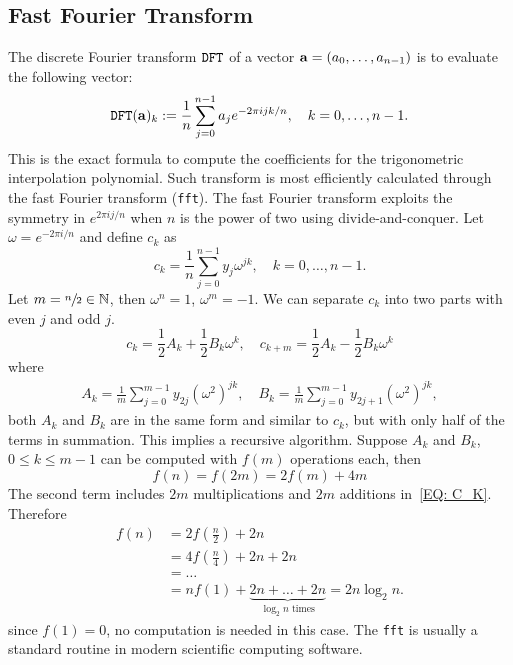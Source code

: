 \subsection{Fast Fourier Transform}
\label{SSec: 2-Fas-Fou-Tra}
The discrete Fourier transform $\textup{\texttt{DFT}}$ of a vector $\mathbf a = (a_0, \dots, a_{n-1})$ is to evaluate the following vector:
$$\textup{\texttt{DFT}}(\mathbf a)_{k} := \frac{1}{n}\sum_{j=0}^{n-1} a_je^{-2\pi i jk/n},\quad k = 0,\dots, n-1.$$
This is the exact formula to compute the coefficients for the trigonometric interpolation polynomial. Such transform is most efficiently calculated through the fast Fourier transform (\texttt{fft}).
The fast Fourier transform exploits the symmetry in $e^{2\pi i j/n}$ when $n$ is the power of two using divide-and-conquer. Let $\omega = e^{-2\pi i/n}$ and define $c_k$ as 
\begin{equation}
    c_k = \frac{1}{n}\sum_{j=0}^{n-1} y_j\omega^{jk},\quad k = 0,\dots, n-1.
\end{equation}
Let $m = \sfrac{n}{2}\in \mathbb N$, then $\omega^n = 1$, $\omega^m = -1$. We can separate $c_k$ into two parts with even $j$ and odd $j$.
\begin{equation}\label{EQ: C_K}
    c_k = \frac{1}{2} A_k + \frac{1}{2} B_k \omega^k,\quad c_{k+m} = \frac{1}{2} A_k - \frac{1}{2} B_k \omega^k 
\end{equation}
where 
\begin{equation}\label{EQ: AK BK}
    \begin{aligned}
        A_k = \frac{1}{m} \sum_{j=0}^{m-1} y_{2j} (\omega^2)^{jk},\quad B_k = \frac{1}{m} \sum_{j=0}^{m-1} y_{2j+1} (\omega^2)^{jk},
    \end{aligned}
\end{equation}
both $A_k$ and $B_k$ are in the same form and similar to $c_k$, but with only half of the terms in summation. This implies a recursive algorithm. Suppose $A_k$ and $B_k$, $0\le k\le m-1$ can be computed with $f(m)$ operations each, then 
\begin{equation}
   f(n) =  f(2m) = 2 f(m) + 4m
\end{equation}
The second term includes $2m$ multiplications and $2m$ additions in~\eqref{EQ: C_K}. Therefore
\begin{equation}
    \begin{aligned}
        f(n)& = 2f(\frac{n}{2}) + 2n \\
&= 4f(\frac{n}{4}) + 2 n + 2n \\ 
&=\dots \\
&= n f(1) + \underbrace{2n + \dots + 2n}_{\log_2 n \text{ times}} = 2n \log_2 n.
    \end{aligned}
\end{equation}
since $f(1) = 0$, no computation is needed in this case.  The \texttt{fft} is usually a standard routine in modern scientific computing software. 

